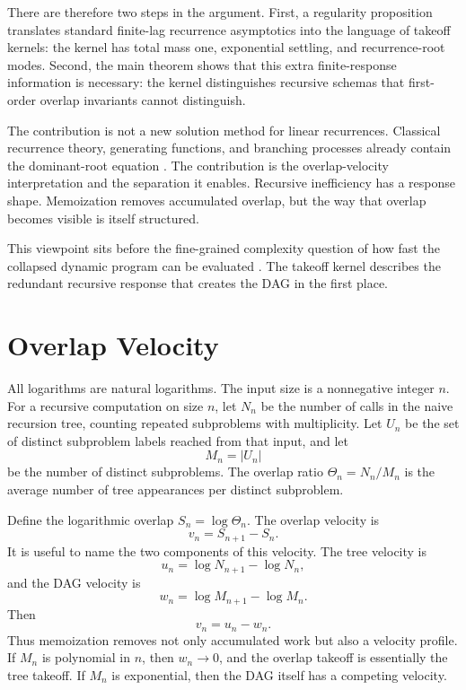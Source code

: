 \documentclass[10pt,twocolumn]{article}
\begin{document}
There are therefore two steps in the argument.  First, a regularity proposition translates standard finite-lag recurrence asymptotics into the language of takeoff kernels: the kernel has total mass one, exponential settling, and recurrence-root modes.  Second, the main theorem shows that this extra finite-response information is necessary: the kernel distinguishes recursive schemas that first-order overlap invariants cannot distinguish.

The contribution is not a new solution method for linear recurrences.  Classical recurrence theory, generating functions, and branching processes already contain the dominant-root equation \cite{bellman1952,biggins1977,flajolet2009}.  The contribution is the overlap-velocity interpretation and the separation it enables.  Recursive inefficiency has a response shape.  Memoization removes accumulated overlap, but the way that overlap becomes visible is itself structured.

This viewpoint sits before the fine-grained complexity question of how fast the collapsed dynamic program can be evaluated \cite{backurs2015,abboud2015,bringmann2015,kunnemann2017,alman2024,jin2024}.  The takeoff kernel describes the redundant recursive response that creates the DAG in the first place.

\section{Overlap Velocity}

All logarithms are natural logarithms.  The input size is a nonnegative integer \(n\).  For a recursive computation on size \(n\), let \(N_n\) be the number of calls in the naive recursion tree, counting repeated subproblems with multiplicity.  Let \(U_n\) be the set of distinct subproblem labels reached from that input, and let
\[
        M_n=|U_n|
\]
be the number of distinct subproblems.  The overlap ratio \(\Theta_n=N_n/M_n\) is the average number of tree appearances per distinct subproblem.

Define the logarithmic overlap \(S_n=\log \Theta_n\).  The overlap velocity is
\[
        v_n=S_{n+1}-S_n.
\]
It is useful to name the two components of this velocity.  The tree velocity is
\[
        u_n=\log N_{n+1}-\log N_n,
\]
and the DAG velocity is
\[
        w_n=\log M_{n+1}-\log M_n.
\]
Then
\[
        v_n=u_n-w_n.
\]
Thus memoization removes not only accumulated work but also a velocity profile.  If \(M_n\) is polynomial in \(n\), then \(w_n\to 0\), and the overlap takeoff is essentially the tree takeoff.  If \(M_n\) is exponential, then the DAG itself has a competing velocity.
\end{document}

